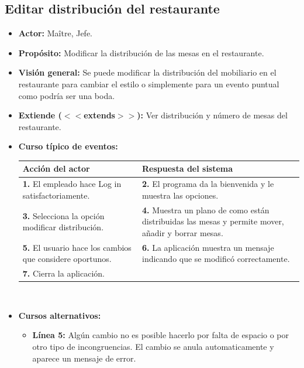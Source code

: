 \documentclass[spanish,a4paper,11pt, twoside]{report}	%
\begin{document}

		\subsection{Editar distribución del restaurante}
			\begin{itemize}
			\item \textbf{Actor:} Maître, Jefe.
			\item \textbf{Propósito:} Modificar la distribución de las mesas en el restaurante.
			\item \textbf{Visión general:} Se puede modificar la distribución del mobiliario en el restaurante para cambiar el estilo o simplemente para un evento puntual como podría ser una boda.
			\item \textbf{Extiende ($<<$extends$>>$):} Ver distribución y número de mesas del restaurante.
			\item \textbf{Curso típico de eventos:} 	\\
				\begin{tabular}{|p{6cm}||p{6cm}|}
				\hline
				\textbf{Acción del actor} & \textbf{Respuesta del sistema} \\ \hline \hline
				\textbf{1.} El empleado hace Log in satisfactoriamente. & \textbf{2.} El programa da la bienvenida y le muestra las opciones. \\ \hline
				\textbf{3.} Selecciona la opción modificar distribución. & \textbf{4.} Muestra un plano de como están distribuidas las mesas y permite mover, añadir y borrar mesas. \\ \hline
				\textbf{5.} El usuario hace los cambios que considere oportunos.	& \textbf{6.} La aplicación muestra un mensaje indicando que se modificó correctamente. \\ \hline
				\textbf{7.} Cierra la aplicación. & \textbf{} \\ \hline
			\end{tabular}
			\\
			\item \textbf{Cursos alternativos:} 
			\begin{itemize}
			\item  \textbf{Línea 5:} Algún cambio no es posible hacerlo por falta de espacio o por otro tipo de incongruencias. El cambio se anula automaticamente y aparece un mensaje de error.
			\end {itemize}
		\end {itemize}

\end{document}

